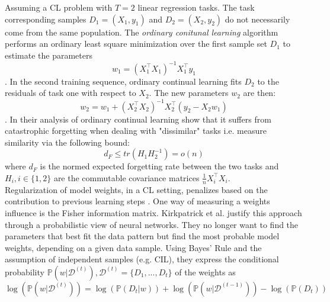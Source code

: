 Assuming a CL problem with $T=2$ linear regression tasks. The task corresponding samples $D_1 = (X_1, y_1)$ and $D_2 = (X_2, y_2)$ do not necessarily come from the same population. The \textit{ordinary conitunal learning} \cite{evron2022,li2024fixeddesignanalysisregularizationbased} algorithm performs an ordinary least square minimization over the first sample set $D_1$ to estimate the parameters
\begin{equation}
	w_1 = (X_1^\top X_1)^{-1}X_1^\top y_1
\end{equation}. In the second training sequence, ordinary continual learning fits $D_2$ to the residuals of task one with respect to $X_2$. The new parameters $w_2$ are then:
\begin{equation}
	w_2 = w_1 + (X_2^\top X_2)^{-1}X_2^\top (y_2 - X_2w_1)
\end{equation}. In their analysis of ordinary continual learning \cite{li2024fixeddesignanalysisregularizationbased} show that it suffers from catastrophic forgetting when dealing with "dissimilar" tasks i.e.\cite{li2024fixeddesignanalysisregularizationbased} measure similarity via the following bound:
\begin{equation}
d_F \leq tr(H_1H_2^{-1})=o(n)
\end{equation}
where $d_F$ is the normed expected forgetting rate between the two tasks and $H_i, i\in\{1,2\}$ are the commutable covariance matrices $\frac{1}{n}X_i^\top X_i$.\\


Regularization of model weights, in a CL setting, penalizes based on the contribution to previous learning steps \cite{LW}. One way of measuring a weights influence is the Fisher information matrix. Kirkpatrick et al. \cite{JK} justify this approach through a probabilistic view of neural networks. They no longer want to find the parameters that best fit the data pattern but find the most probable model weights, depending on a given data sample. Using Bayes' Rule and the assumption of independent samples (e.g. CIL), they express the conditional probability $\mathbb{P}(w|\mathcal{D}^{(t)}), \mathcal{D}^{(t)} = \{D_1, ..., D_t\}$ of the weights as
\begin{equation}
	\log(\mathbb{P}(w|\mathcal{D}^{(t)})) = \log(\mathbb{P}(D_{t}|w)) + \log(\mathbb{P}(w|\mathcal{D}^{(t-1)})) - \log(\mathbb{P}(D_t))
\end{equation}
